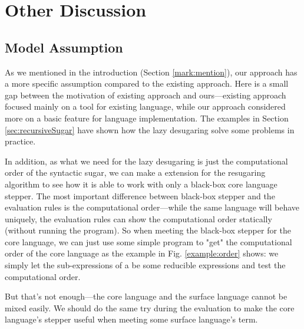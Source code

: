 \section{Other Discussion}
\label{sec5}

\subsection{Model Assumption}
\label{sec5.1}


As we mentioned in the introduction (Section \ref{mark:mention}), our approach has a more specific assumption compared to the existing approach. Here is a small gap between the motivation of existing approach and ours---existing approach focused mainly on a tool for existing language, while our approach considered more on a basic feature for language implementation. The examples in Section \ref{sec:recursiveSugar} have shown how the lazy desugaring solve some problems in practice.

In addition, as what we need for the lazy desugaring is just the computational order of the syntactic sugar, we can make a extension for the resugaring algorithm to see how it is able to work with only a black-box core language stepper. The most important difference between black-box stepper and the evaluation rules is the computational order---while the same language will behave uniquely, the evaluation rules can show the computational order statically (without running the program). So when meeting the black-box stepper for the core language, we can just use some simple program to "get" the computational order of the core language as the  example in Fig. \ref{example:order} shows: we simply let the sub-expressions of a  be some reducible expressions and test the computational order.



But that's not enough---the core language and the surface language cannot be mixed easily. We should do the same try during the evaluation to make the core language's stepper useful when meeting some surface language's term.

